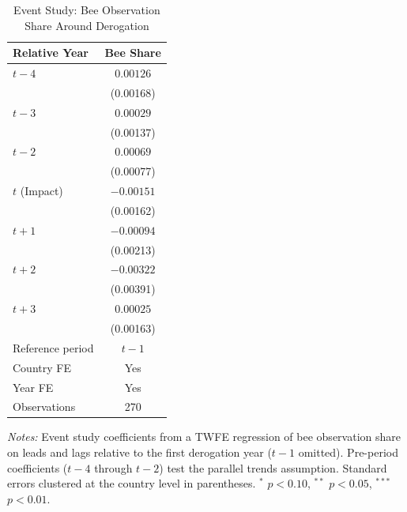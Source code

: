 \begin{table}[htbp]
\centering
\caption{Event Study: Bee Observation Share Around Derogation}
\label{tab:event}
\begin{threeparttable}
\begin{tabular}{lc}
\toprule
Relative Year & Bee Share \\
\midrule
$t - 4$ & $0.00126$ \\
 & (0.00168) \\
$t - 3$ & $0.00029$ \\
 & (0.00137) \\
$t - 2$ & $0.00069$ \\
 & (0.00077) \\
$t$ (Impact) & $-0.00151$ \\
 & (0.00162) \\
$t + 1$ & $-0.00094$ \\
 & (0.00213) \\
$t + 2$ & $-0.00322$ \\
 & (0.00391) \\
$t + 3$ & $0.00025$ \\
 & (0.00163) \\
\midrule
Reference period & $t - 1$ \\
Country FE & Yes \\
Year FE & Yes \\
Observations & 270 \\
\bottomrule
\end{tabular}
\begin{tablenotes}[flushleft]
\small
\item \textit{Notes:} Event study coefficients from a TWFE regression of bee observation share on leads and lags relative to the first derogation year ($t - 1$ omitted). Pre-period coefficients ($t-4$ through $t-2$) test the parallel trends assumption. Standard errors clustered at the country level in parentheses. $^{*}$ $p<0.10$, $^{**}$ $p<0.05$, $^{***}$ $p<0.01$.
\end{tablenotes}
\end{threeparttable}
\end{table}

